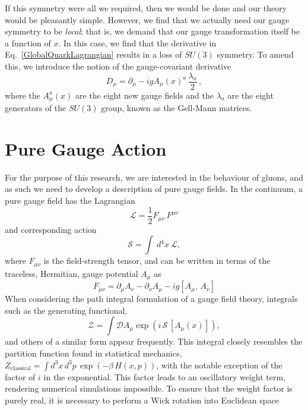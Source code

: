 If this symmetry were all we required, then we would be done and our theory would be pleasantly simple. However, we find that we actually need our gauge symmetry to be \textit{local}; that is, we demand that our gauge transformation itself be a function of $x$\cite{peskin2018introduction}. In this case, we find that the derivative in Eq.~\ref{GlobalQuarkLagrangian} results in a loss of $SU(3)$ symmetry. To amend this, we introduce the notion of the gauge-covariant derivative
\begin{equation}
D_\mu = \partial_\mu - ig A_\mu(x)^a\,\frac{\lambda_a}{2}\, ,
\end{equation}
where the $A_\mu^a(x)$ are the eight new gauge fields and the $\lambda_a$ are the eight generators of the $SU(3)$ group, known as the Gell-Mann matrices.
\section{Pure Gauge Action}
For the purpose of this research, we are interested in the behaviour of gluons, and as such we need to develop a description of pure gauge fields. In the continuum, a pure gauge field has the Lagrangian\cite{ryder1996quantum}
\begin{equation}
\mathcal{L}=\frac{1}{2}F_{\mu\nu}\,F^{\mu\nu}
\label{QCDLagrangian}
\end{equation}
and corresponding action
\begin{equation}
\mathcal{S}=\int~d^4x~\mathcal{L},
\label{QCDAction}
\end{equation}
where $F_{\mu\nu}$ is the field-strength tensor, and can be written in terms of the traceless, Hermitian, gauge potential $A_\mu$ as
\begin{equation}
F_{\mu\nu}=\partial_\mu A_\nu - \partial_\nu A_\mu -ig[A_\mu,\,A_\nu]
\label{FieldStrengthTensor}
\end{equation}
When considering the path integral formulation of a gauge field theory, integrals such as the generating functional,
\begin{equation}
\mathcal{Z} =\int \mathcal{D} A_\mu \exp\left(i\,\mathcal{S}\,[A_\mu(x)]\right),
\end{equation}
and others of a similar form appear frequently. This integral closely resembles the partition function found in statistical mechanics, $Z_{\text{classical}}=\int d^3x\,d^3p\,\exp\left(-\beta\,H(x,p)\right)$, with the notable exception of the factor of $i$ in the exponential. This factor leads to an oscillatory weight term, rendering numerical simulations impossible. To ensure that the weight factor is purely real, it is necessary to perform a Wick rotation into Euclidean space\cite{Schafer:1996wv,Wilson:1974sk}
